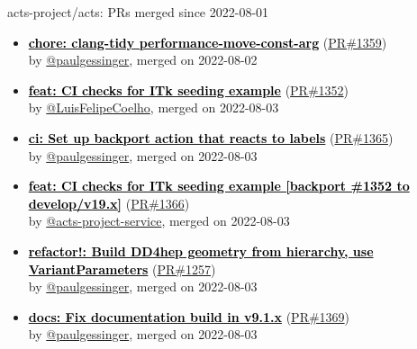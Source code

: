 \begin{frame}[allowframebreaks]{ acts-project/acts: PRs merged since 2022-08-01 }
\begin{itemize}
    \item
    \textbf{\href{https://github.com/acts-project/acts/pull/1359}{\textcolor{black}{chore: clang-tidy performance-move-const-arg}}}
    (\href{https://github.com/acts-project/acts/pull/1359}{PR\#1359}) \\
    by \href{https://github.com/paulgessinger}{ @paulgessinger}, merged on 2022-08-02

    \item
    \textbf{\href{https://github.com/acts-project/acts/pull/1352}{\textcolor{black}{feat: CI checks for ITk seeding example}}}
    (\href{https://github.com/acts-project/acts/pull/1352}{PR\#1352}) \\
    by \href{https://github.com/LuisFelipeCoelho}{ @LuisFelipeCoelho}, merged on 2022-08-03

    \item
    \textbf{\href{https://github.com/acts-project/acts/pull/1365}{\textcolor{black}{ci: Set up backport action that reacts to labels}}}
    (\href{https://github.com/acts-project/acts/pull/1365}{PR\#1365}) \\
    by \href{https://github.com/paulgessinger}{ @paulgessinger}, merged on 2022-08-03

    \item
    \textbf{\href{https://github.com/acts-project/acts/pull/1366}{\textcolor{black}{feat: CI checks for ITk seeding example [backport \#1352 to develop/v19.x]}}}
    (\href{https://github.com/acts-project/acts/pull/1366}{PR\#1366}) \\
    by \href{https://github.com/acts-project-service}{ @acts-project-service}, merged on 2022-08-03

    \item
    \textbf{\href{https://github.com/acts-project/acts/pull/1257}{\textcolor{black}{refactor!: Build DD4hep geometry from hierarchy, use VariantParameters}}}
    (\href{https://github.com/acts-project/acts/pull/1257}{PR\#1257}) \\
    by \href{https://github.com/paulgessinger}{ @paulgessinger}, merged on 2022-08-03

    \item
    \textbf{\href{https://github.com/acts-project/acts/pull/1369}{\textcolor{black}{docs: Fix documentation build in v9.1.x}}}
    (\href{https://github.com/acts-project/acts/pull/1369}{PR\#1369}) \\
    by \href{https://github.com/paulgessinger}{ @paulgessinger}, merged on 2022-08-03


\end{itemize}
\end{frame}
